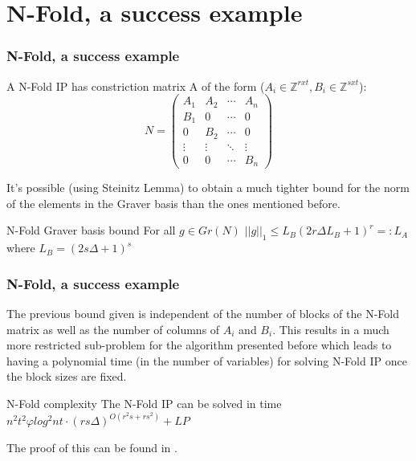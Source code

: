 \documentclass{beamer}
\begin{document}
    \section{N-Fold, a success example}
    \begin{frame}
        \frametitle{N-Fold, a success example}
        
        A N-Fold IP has constriction matrix A of the form ($A_i \in \mathbb{Z}^{rxt}, B_i \in \mathbb{Z}^{sxt}$):\\
        \begin{equation*}
        N = 
        \begin{pmatrix}
        A_1 & A_2 & \cdots & A_n \\
        B_1 & 0   & \cdots & 0 \\
        0   & B_2 & \cdots & 0 \\
        \vdots    & \vdots & \ddots & \vdots  \\
        0   & 0   & \cdots & B_n 
        \end{pmatrix}
        \end{equation*}
        
        \pause
        \vspace{0.5cm}
        It's possible (using Steinitz Lemma) to obtain a much tighter bound for the norm of the elements in the Graver basis than the ones mentioned before.
        
        \begin{block}{N-Fold Graver basis bound}
            For all $g \in Gr(N)$ $||g||_1 \leq L_B (2r\Delta L_B + 1)^r =: L_A$ where $L_B = (2s \Delta + 1)^s$
        \end{block}
        

    \end{frame}
    
    \begin{frame}
        \frametitle{N-Fold, a success example}
        
        The previous bound given is independent of the number of blocks of the N-Fold matrix as well as the number of columns of $A_i$ and $B_i$. This results in a much more restricted sub-problem for the algorithm presented before which leads to having a polynomial time (in the number of variables) for solving N-Fold IP once the block sizes are fixed.
        
        \vspace{0.5cm}
        \begin{block}{N-Fold complexity}
            The N-Fold IP can be solved in time $n^2t^2\varphi log^2nt \cdot (rs\Delta)^{O(r^2s + rs^2)} + LP$
        \end{block}
        
        The proof of this can be found in \cite{EISENBRAND:2018}.

    \end{frame}
    
\end{document}
